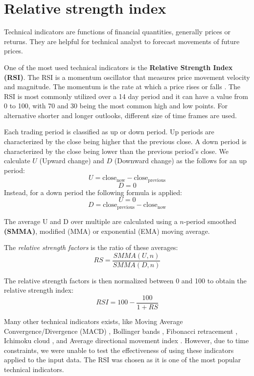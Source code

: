 \hfill \break

\section{Relative strength index}
\label{s:rsi}

Technical indicators are functions of financial quantities, generally prices or returns.  They are helpful for technical analyst to forecast movements of future prices. 

\hfill \break

One of the most used technical indicators is the \textbf{Relative Strength Index (RSI)}. The RSI is a momentum oscillator that measures price movement velocity and magnitude.
The momentum is the rate at which a price rises or falls \cite{wilder1978new}.
The RSI is most commonly utilized over a 14 day period and it can have a value from 0 to 100, with 70 and 30 being the most common high and low points.
For alternative shorter and longer outlooks, different size of time frames are used.

Each trading period is classified as up or down period. Up periods are characterized by the close being higher that the previous close. A down period is characterized by the close being lower than the previous period's close.
We calculate $U$ (Upward change) and $D$ (Downward change) as the follows for an up period:
$$U = \text{close}_{\text{now}} - \text{close}_{\text{previous}}$$
$$D=0$$
Instead, for a down period the following formula is applied:
$$U=0$$
$$D = \text{close}_{\text{previous}} - \text{close}_{\text{now}} $$

The average U and D over multiple are calculated using a $n$-period smoothed \textbf{(SMMA)}, modified (MMA) or exponential (EMA) moving average.

The \textit{relative strength factors} is the ratio of these averages:
$$RS=\frac{SMMA(U,n)}{SMMA(D,n)}$$

The relative strength factors is then normalized between 0 and 100 to obtain the relative strength index:
$$RSI = 100 - \frac{100}{1+RS}$$


Many other technical indicators exists, like Moving Average Convergence/Divergence (MACD) \cite{macd}, Bollinger bands \cite{bollinger}, Fibonacci retracement \cite{kempen2016fibonaccis}, Ichimoku cloud \cite{ichimoku}, and Average directional movement index \cite{wilder1978new}. However, due to time constraints, we were unable to test the effectiveness of using these indicators applied to the input data. The RSI was chosen as it is one of the most popular technical indicators.

